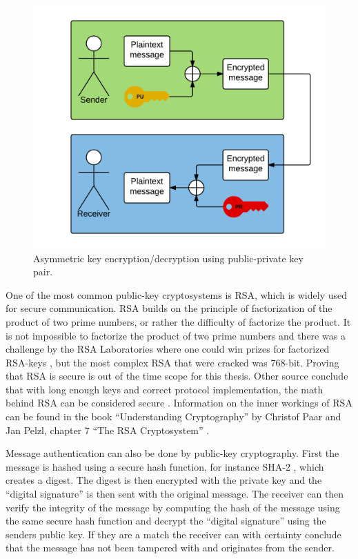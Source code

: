 \begin{figure}[h!]
  \captionsetup{justification=centering,margin=1.5cm}
  \caption{Asymmetric key encryption/decryption using public-private key pair.}
  \label{fig:encrypt_basic}
  \centering
    \includegraphics[width=1\textwidth]{images/encrypt_basic.png}
\end{figure}

One of the most common public-key cryptosystems is RSA, which is widely used for secure communication. RSA builds on the principle of factorization of the product of two prime numbers, or rather the difficulty of factorize the product. It is not impossible to factorize the product of two prime numbers and there was a challenge by the RSA Laboratories where one could win prizes for factorized RSA-keys \cite{rsaChallenge}, but the most complex RSA that were cracked was 768-bit. Proving that RSA is secure is out of the time scope for this thesis. Other source conclude that with long enough keys and correct protocol implementation, the math behind RSA can be considered secure \cite[~p. 194]{cryptoMath}. Information on the inner workings of RSA can be found in the book ``Understanding Cryptography'' by Christof Paar and Jan Pelzl, chapter 7 ``The RSA Cryptosystem'' \cite{cryptoMath}.

Message authentication can also be done by public-key cryptography. First the message is hashed using a secure hash function, for instance SHA-2 \cite{shaRFC}, which creates a digest. The digest is then encrypted with the private key and the ``digital signature'' is then sent with the original message. The receiver can then verify the integrity of the message by computing the hash of the message using the same secure hash function and decrypt the ``digital signature'' using the senders public key. If they are a match the receiver can with certainty conclude that the message has not been tampered with and originates from the sender.

